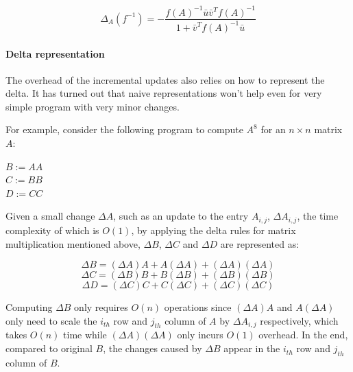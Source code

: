 \begin{equation}\label{eq: matrix_inverse}
\Delta_A(f^{-1}) = -\frac{f(A)^{-1}\bar{u}\bar{v}^Tf(A)^{-1}}{1+\bar{v}^Tf(A)^{-1}\bar{u}}
\end{equation}

\paragraph{Delta representation}
The overhead of the incremental updates also relies on how to represent the delta. It has turned out that naive representations won't help even for very simple program with very minor changes. 

\begin{example}\label{eg: incremental_naive_update}
For example, consider the following program to compute $A^8$ for an $n\times n$ matrix $A$:

\begin{center}
    $B:= AA$\\
    $C:= BB$\\
    $D:= CC$
\end{center}

Given a small change $\Delta A$, such as an update to the entry $A_{i,j}$, $\Delta A_{i,j}$, the time complexity of which is $O(1)$, by applying the delta rules for matrix multiplication mentioned above, $\Delta B$, $\Delta C$ and $\Delta D$ are represented as:

\begin{equation}\label{eq: delta_b}
    \Delta B = (\Delta A) A + A (\Delta A) + (\Delta A) (\Delta A)
\end{equation}
\begin{equation}\label{eq: delta_c}
    \Delta C = (\Delta B) B + B (\Delta B) + (\Delta B) (\Delta B)
\end{equation}
\begin{equation}\label{eq: delta_d}
    \Delta D = (\Delta C) C + C (\Delta C) + (\Delta C) (\Delta C)
\end{equation}
    


Computing $\Delta B$ only requires $O(n)$ operations since $(\Delta A) A$ and $A (\Delta A)$ only need to scale the $i_{th}$ row and $j_{th}$ column of $A$ by $\Delta A_{i,j}$ respectively, which takes $O(n)$ time while $(\Delta A) (\Delta A)$ only incurs $O(1)$ overhead. In the end, compared to original $B$, the changes caused by $\Delta B$ appear in the $i_{th}$ row and $j_{th}$ column of $B$.


\end{example}
